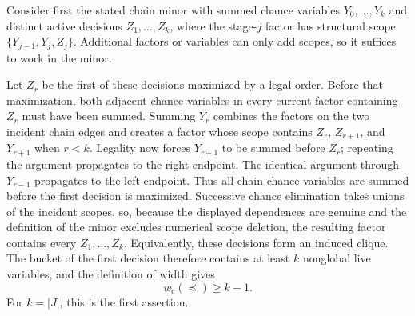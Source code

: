 Consider first the stated chain minor with summed chance variables \(Y_0,\ldots,Y_k\) and distinct active decisions \(Z_1,\ldots,Z_k\), where the stage-\(j\) factor has structural scope \(\{Y_{j-1},Y_j,Z_j\}\).  Additional factors or variables can only add scopes, so it suffices to work in the minor.

Let \(Z_r\) be the first of these decisions maximized by a legal order.  Before that maximization, both adjacent chance variables in every current factor containing \(Z_r\) must have been summed.  Summing \(Y_r\) combines the factors on the two incident chain edges and creates a factor whose scope contains \(Z_r\), \(Z_{r+1}\), and \(Y_{r+1}\) when \(r<k\).  Legality now forces \(Y_{r+1}\) to be summed before \(Z_r\); repeating the argument propagates to the right endpoint.  The identical argument through \(Y_{r-1}\) propagates to the left endpoint.  Thus all chain chance variables are summed before the first decision is maximized.  Successive chance elimination takes unions of the incident scopes, so, because the displayed dependences are genuine and the definition of the minor excludes numerical scope deletion, the resulting factor contains every \(Z_1,\ldots,Z_k\).  Equivalently, these decisions form an induced clique.  The bucket of the first decision therefore contains at least \(k\) nonglobal live variables, and the definition of width gives
\[
 w_{\mathrm c}(\preceq)\ge k-1.
 \tag{1}
\]
For \(k=|J|\), this is the first assertion.

